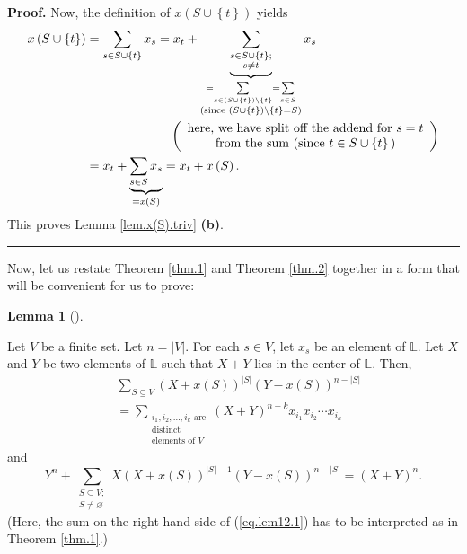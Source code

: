\documentclass[numbers=enddot,12pt,final,onecolumn,notitlepage]{scrartcl}%
\theoremstyle{definition}
\newtheorem{lem}[theo]{Lemma}
\newenvironment{lemma}[1][]
{\begin{lem}[#1]\begin{leftbar}}
{\end{leftbar}\end{lem}}
\newenvironment{proof}[1][Proof]{\noindent\textbf{#1.} }{\ \rule{0.5em}{0.5em}}
\let\sumnonlimits\sum
\renewcommand{\sum}{\sumnonlimits\limits}
\newenvironment{verlong}{}{}
\begin{document}
\begin{verlong}
\begin{proof}
Now, the definition of $x\left(  S\cup\left\{  t\right\}  \right)  $ yields%
\begin{align*}
x\left(  S\cup\left\{  t\right\}  \right)   &  =\sum_{s\in S\cup\left\{
t\right\}  }x_{s}=x_{t}+\underbrace{\sum_{\substack{s\in S\cup\left\{
t\right\}  ;\\s\neq t}}}_{\substack{=\sum_{s\in\left(  S\cup\left\{
t\right\}  \right)  \setminus\left\{  t\right\}  }=\sum_{s\in S}\\\text{(since
}\left(  S\cup\left\{  t\right\}  \right)  \setminus\left\{  t\right\}
=S\text{)}}}x_{s}\\
&  \ \ \ \ \ \ \ \ \ \ \ \ \ \ \ \ \ \ \ \ \left(
\begin{array}
[c]{c}%
\text{here, we have split off the addend for }s=t\\
\text{from the sum (since }t\in S\cup\left\{  t\right\}  \text{)}%
\end{array}
\right) \\
&  =x_{t}+\underbrace{\sum_{s\in S}x_{s}}_{=x\left(  S\right)  }%
=x_{t}+x\left(  S\right)  .
\end{align*}
This proves Lemma \ref{lem.x(S).triv} \textbf{(b)}.
\end{proof}

Now, let us restate Theorem \ref{thm.1} and Theorem \ref{thm.2} together in a
form that will be convenient for us to prove:

\begin{lemma}
\label{lem.12}Let $V$ be a finite set. Let $n=\left\vert V\right\vert $. For
each $s\in V$, let $x_{s}$ be an element of $\mathbb{L}$. Let $X$ and $Y$ be
two elements of $\mathbb{L}$ such that $X+Y$ lies in the center of
$\mathbb{L}$. Then,%
\begin{align}
&  \sum_{S\subseteq V}\left(  X+x\left(  S\right)  \right)  ^{\left\vert
S\right\vert }\left(  Y-x\left(  S\right)  \right)  ^{n-\left\vert
S\right\vert }\nonumber\\
&  =\sum_{\substack{i_{1},i_{2},\ldots,i_{k}\text{ are}\\\text{distinct}%
\\\text{elements of }V}}\left(  X+Y\right)  ^{n-k}x_{i_{1}}x_{i_{2}}\cdots
x_{i_{k}} \label{eq.lem12.1}%
\end{align}
and%
\begin{equation}
Y^{n}+\sum_{\substack{S\subseteq V;\\S\neq\varnothing}}X\left(  X+x\left(
S\right)  \right)  ^{\left\vert S\right\vert -1}\left(  Y-x\left(  S\right)
\right)  ^{n-\left\vert S\right\vert }=\left(  X+Y\right)  ^{n}.
\label{eq.lem12.2}%
\end{equation}
(Here, the sum on the right hand side of (\ref{eq.lem12.1}) has to be
interpreted as in Theorem \ref{thm.1}.)
\end{lemma}


\end{verlong}
\end{document}
